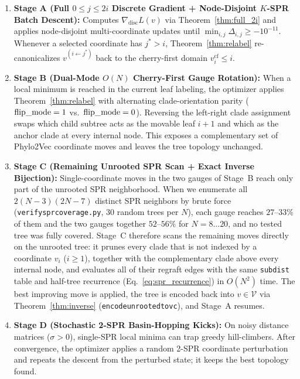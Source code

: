 \documentclass[11pt,a4paper]{article}
\makeatletter
\DeclareRobustCommand{\_}{\ifmmode\nfss@text{\textunderscore}\else\textunderscore\allowbreak\fi}
\theoremstyle{definition}
\makeatother
\begin{document}
\begin{enumerate}
    \item \textbf{Stage A (Full $0 \le j \le 2i$ Discrete Gradient + Node-Disjoint $K$-SPR Batch Descent):} Computes $\nabla_{\text{disc}} L(v)$ via Theorem~\ref{thm:full_2i} and applies node-disjoint multi-coordinate updates until $\min_{i, j} \Delta_{i, j} \ge -10^{-11}$. Whenever a selected coordinate has $j^* > i$, Theorem~\ref{thm:relabel} re-canonicalizes $v^{(i \leftarrow j^*)}$ back to the cherry-first domain $v^{\text{cf}}_i \le i$.
    \item \textbf{Stage B (Dual-Mode $O(N)$ Cherry-First Gauge Rotation):} When a local minimum is reached in the current leaf labeling, the optimizer applies Theorem~\ref{thm:relabel} with alternating clade-orientation parity ($\text{flip\_mode} = 1$ vs.\ $\text{flip\_mode} = 0$). Reversing the left-right clade assignment swaps which child subtree acts as the movable leaf $i+1$ and which as the anchor clade at every internal node. This exposes a complementary set of Phylo2Vec coordinate moves and leaves the tree topology unchanged.
    \item \textbf{Stage C (Remaining Unrooted SPR Scan + Exact Inverse Bijection):} Single-coordinate moves in the two gauges of Stage~B reach only part of the unrooted SPR neighborhood. When we enumerate all $2(N-3)(2N-7)$ distinct SPR neighbors by brute force (\texttt{verify\_spr\_coverage.py}, $30$ random trees per $N$), each gauge reaches $27$--$33\%$ of them and the two gauges together $52$--$56\%$ for $N = 8 \dots 20$, and no tested tree was fully covered. Stage~C therefore scans the remaining moves directly on the unrooted tree: it prunes every clade that is not indexed by a coordinate $v_i$ ($i \ge 1$), together with the complementary clade above every internal node, and evaluates all of their regraft edges with the same \texttt{subdist} table and half-tree recurrence (Eq.~\eqref{eq:spr_recurrence}) in $O(N^2)$ time. The best improving move is applied, the tree is encoded back into $v \in \mathcal{V}$ via Theorem~\ref{thm:inverse} (\texttt{encode\_unrooted\_to\_v\_c}), and Stage~A resumes.
    \item \textbf{Stage D (Stochastic 2-SPR Basin-Hopping Kicks):} On noisy distance matrices ($\sigma > 0$), single-SPR local minima can trap greedy hill-climbers. After convergence, the optimizer applies a random 2-SPR coordinate perturbation and repeats the descent from the perturbed state; it keeps the best topology found.
\end{enumerate}
\end{document}
